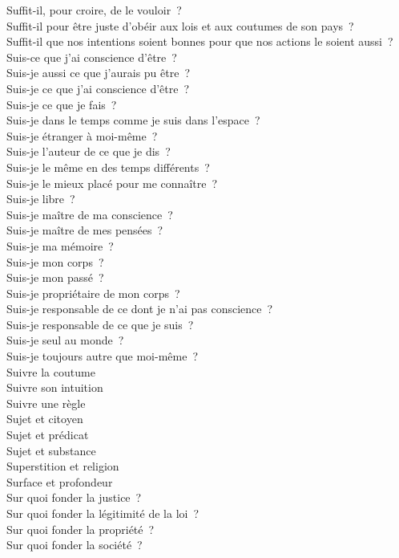 \documentclass[a4paper,12pt]{article}
\begin{document}
Suffit-il, pour croire, de le vouloir ? \\
Suffit-il pour être juste d'obéir aux lois et aux coutumes de son pays ? \\
Suffit-il que nos intentions soient bonnes pour que nos actions le soient aussi ? \\
Suis-ce que j'ai conscience d'être ? \\
Suis-je aussi ce que j'aurais pu être ? \\
Suis-je ce que j'ai conscience d'être ? \\
Suis-je ce que je fais ? \\
Suis-je dans le temps comme je suis dans l'espace ? \\
Suis-je étranger à moi-même ? \\
Suis-je l'auteur de ce que je dis ? \\
Suis-je le même en des temps différents ? \\
Suis-je le mieux placé pour me connaître ? \\
Suis-je libre ? \\
Suis-je maître de ma conscience ? \\
Suis-je maître de mes pensées ? \\
Suis-je ma mémoire ? \\
Suis-je mon corps ? \\
Suis-je mon passé ? \\
Suis-je propriétaire de mon corps ? \\
Suis-je responsable de ce dont je n'ai pas conscience ? \\
Suis-je responsable de ce que je suis ? \\
Suis-je seul au monde ? \\
Suis-je toujours autre que moi-même ? \\
Suivre la coutume \\
Suivre son intuition \\
Suivre une règle \\
Sujet et citoyen \\
Sujet et prédicat \\
Sujet et substance \\
Superstition et religion \\
Surface et profondeur \\
Sur quoi fonder la justice ? \\
Sur quoi fonder la légitimité de la loi ? \\
Sur quoi fonder la propriété ? \\
Sur quoi fonder la société ? \\
\end{document}
